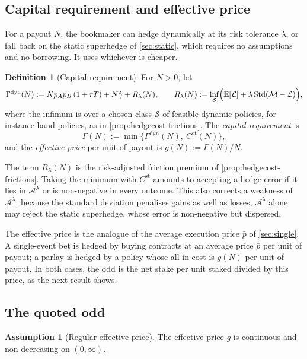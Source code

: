 \documentclass[11pt,a4paper]{article}
\theoremstyle{plain}
\theoremstyle{definition}
\newtheorem{definition}[theorem]{Definition}
\newtheorem{assumption}[theorem]{Assumption}
\theoremstyle{remark}
\newcommand{\E}{\mathbb{E}}
\newcommand{\1}{\mathbf{1}}
\begin{document}
\subsection{Capital requirement and effective price}

For a payout $N$, the bookmaker can hedge dynamically at its risk tolerance $\lambda$, or fall back on the static superhedge of \cref{sec:static}, which requires no assumptions and no borrowing. It uses whichever is cheaper.

\begin{definition}[Capital requirement]
\label{def:capital}
For $N>0$, let
\[
\Gamma^{\mathrm{dyn}}(N) := Np_Ap_B\,(1+rT) + N\hat\gamma + R_\lambda(N),\qquad R_\lambda(N) := \inf_{\mathcal{S}}\Bigl(\E[\mathcal{L}] + \lambda\operatorname{Std}(\mathcal{M}-\mathcal{L})\Bigr),
\]
where the infimum is over a chosen class $\mathcal{S}$ of feasible dynamic policies, for instance band policies, as in \cref{prop:hedgecost-frictions}. The \emph{capital requirement} is
\[
\Gamma(N) := \min\bigl\{\Gamma^{\mathrm{dyn}}(N),\ C^{\mathrm{st}}(N)\bigr\},
\]
and the \emph{effective price} per unit of payout is $g(N) := \Gamma(N)/N$.
\end{definition}

The term $R_\lambda(N)$ is the risk-adjusted friction premium of \cref{prop:hedgecost-frictions}. Taking the minimum with $C^{\mathrm{st}}$ amounts to accepting a hedge error if it lies in $\mathcal{A}^\lambda$ or is non-negative in every outcome. This also corrects a weakness of $\mathcal{A}^\lambda$: because the standard deviation penalises gains as well as losses, $\mathcal{A}^\lambda$ alone may reject the static superhedge, whose error is non-negative but dispersed.

The effective price is the analogue of the average execution price $\bar p$ of \cref{sec:single}. A single-event bet is hedged by buying contracts at an average price $\bar p$ per unit of payout; a parlay is hedged by a policy whose all-in cost is $g(N)$ per unit of payout. In both cases, the odd is the net stake per unit staked divided by this price, as the next result shows.

\subsection{The quoted odd}

\begin{assumption}[Regular effective price]
\label{ass:regular}
The effective price $g$ is continuous and non-decreasing on $(0,\infty)$.
\end{assumption}
\end{document}
